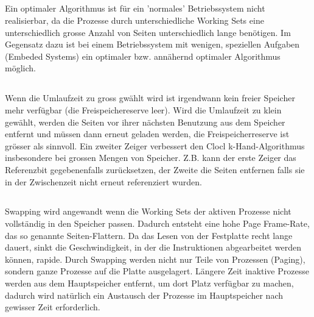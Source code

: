 \subsection{}
\begin{answer}
Ein optimaler Algorithmus ist für ein 'normales' Betriebssystem nicht realisierbar, da die Prozesse
durch unterschiedliche Working Sets eine unterschiedlich grosse Anzahl von Seiten unterschiedlich
lange benötigen.
Im Gegensatz dazu ist bei einem Betriebssystem mit wenigen, speziellen Aufgaben (Embeded
Systems) ein optimaler bzw. annähernd optimaler Algorithmus möglich.
\end{answer}

\subsection{}
\begin{answer}
Wenn die Umlaufzeit zu gross gwählt wird ist irgendwann kein freier Speicher mehr verfügbar (die
Freispeichereserve leer).
Wird die Umlaufzeit zu klein gewählt, werden die Seiten vor ihrer nächsten Benutzung aus dem
Speicher entfernt und müssen dann erneut geladen werden, die Freispeicherreserve ist grösser als
sinnvoll.
Ein zweiter Zeiger verbessert den Clocl k-Hand-Algorithmus insbesondere bei grossen Mengen von
Speicher. Z.B. kann der erste Zeiger das Referenzbit gegebenenfalls zurücksetzen, der Zweite die
Seiten entfernen falls sie in der Zwischenzeit nicht erneut referenziert wurden.
\end{answer}

\subsection{}
\begin{answer}
Swapping wird angewandt wenn die Working Sets der aktiven Prozesse nicht vollständig in den
Speicher passen.
Dadurch entsteht eine hohe Page Frame-Rate, das so genannte Seiten-Flattern. Da das Lesen
von der Festplatte recht lange dauert, sinkt die Geschwindigkeit, in der die Instruktionen abgearbeitet
werden können, rapide.
Durch Swapping werden nicht nur Teile von Prozessen (Paging), sondern ganze Prozesse auf die
Platte ausgelagert. Längere Zeit inaktive Prozesse werden aus dem Hauptspeicher entfernt, um
dort Platz verfügbar zu machen, dadurch wird natürlich ein Austausch der Prozesse im Hauptspeicher
nach gewisser Zeit erforderlich.
\end{answer}

